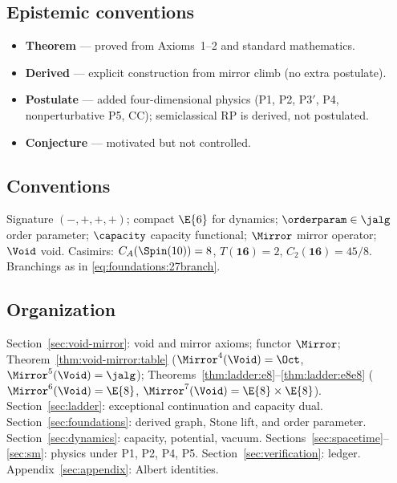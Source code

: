 \subsection{Epistemic conventions}
\label{sec:intro:status}

\begin{itemize}
  \item \textbf{Theorem} --- proved from Axioms~1--2 and standard mathematics.
  \item \textbf{Derived} --- explicit construction from mirror climb (no extra
    postulate).
  \item \textbf{Postulate} --- added four-dimensional physics (P1, P2, P3$'$, P4,
    nonperturbative P5, CC); semiclassical RP is derived, not postulated.
  \item \textbf{Conjecture} --- motivated but not controlled.
\end{itemize}

\subsection{Conventions}
\label{sec:intro:conventions}

Signature $(-,+,+,+)$; compact $\E{6}$ for dynamics; $\orderparam\in\jalg$
order parameter; $\capacity$ capacity functional; $\Mirror$ mirror operator;
$\Void$ void. Casimirs: $C_A(\Spin(10))=8$, $T(\mathbf{16})=2$,
$C_2(\mathbf{16})=45/8$. Branchings as in \eqref{eq:foundations:27branch}.

\subsection{Organization}

Section~\ref{sec:void-mirror}: void and mirror axioms; functor $\Mirror$;
Theorem~\ref{thm:void-mirror:table} ($\Mirror^4(\Void)=\Oct$,
$\Mirror^5(\Void)=\jalg$); Theorems~\ref{thm:ladder:e8}--\ref{thm:ladder:e8e8}
($\Mirror^6(\Void)=\E{8}$, $\Mirror^7(\Void)=\E{8}\times\E{8}$).
Section~\ref{sec:ladder}: exceptional continuation and capacity dual.
Section~\ref{sec:foundations}: derived graph, Stone lift, and order parameter.
Section~\ref{sec:dynamics}: capacity, potential, vacuum.
Sections~\ref{sec:spacetime}--\ref{sec:sm}: physics under P1, P2, P4, P5.
Section~\ref{sec:verification}: ledger.
Appendix~\ref{sec:appendix}: Albert identities.